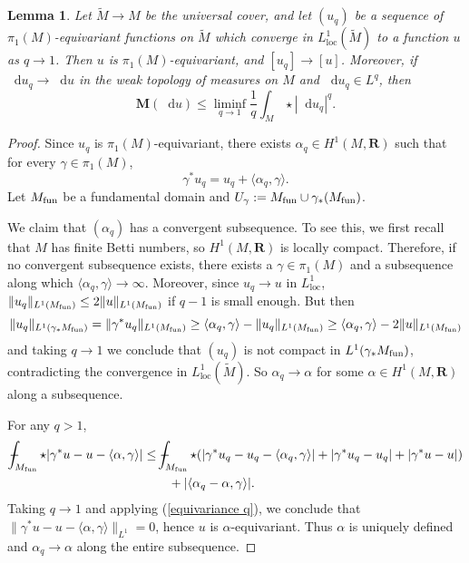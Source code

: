 \documentclass[reqno,11pt]{amsart}
\newcommand{\RR}{\mathbf{R}}
\newcommand*\dif{\mathop{}\!\mathrm{d}}
\newcommand{\Mass}{\mathbf M}
\newcommand{\loc}{\mathrm{loc}}
\newtheorem{lemma}[theorem]{Lemma}
\theoremstyle{definition}
\numberwithin{equation}{section}
\def\Xint#1{\mathchoice
{\XXint\displaystyle\textstyle{#1}}%
{\XXint\textstyle\scriptstyle{#1}}%
{\XXint\scriptstyle\scriptscriptstyle{#1}}%
{\XXint\scriptscriptstyle\scriptscriptstyle{#1}}%
\!\int}
\def\XXint#1#2#3{{\setbox0=\hbox{$#1{#2#3}{\int}$ }
\vcenter{\hbox{$#2#3$ }}\kern-.6\wd0}}
\def\dashint{\Xint-}
\begin{document}
\begin{lemma}\label{L1 convergence preserves pi1}
Let $\tilde M \to M$ be the universal cover, and let $(u_q)$ be a sequence of $\pi_1(M)$-equivariant functions on $\tilde M$ which converge in $L^1_\loc(\tilde M)$ to a function $u$ as $q \to 1$.
Then $u$ is $\pi_1(M)$-equivariant, and $[u_q] \to [u]$.
Moreover, if $\dif u_q \to \dif u$ in the weak topology of measures on $M$ and $\dif u_q \in L^q$, then
\begin{equation}\label{q to 1 Holder}
\Mass(\dif u) \leq \liminf_{q \to 1} \frac{1}{q} \int_M \star |\dif u_q|^q.
\end{equation}
\end{lemma}
\begin{proof}
Since $u_q$ is $\pi_1(M)$-equivariant, there exists $\alpha_q \in H^1(M, \RR)$ such that for every $\gamma \in \pi_1(M)$,
\begin{equation}\label{equivariance q}
	\gamma^* u_q = u_q + \langle \alpha_q, \gamma\rangle.
\end{equation}
Let $M_{\rm fun}$ be a fundamental domain and $U_\gamma := M_{\rm fun} \cup \gamma_* (M_{\rm fun})$.

We claim that $(\alpha_q)$ has a convergent subsequence.
To see this, we first recall that $M$ has finite Betti numbers, so $H^1(M, \RR)$ is locally compact.
Therefore, if no convergent subsequence exists, there exists a $\gamma \in \pi_1(M)$ and a subsequence along which $\langle \alpha_q, \gamma\rangle \to \infty$.
Moreover, since $u_q \to u$ in $L^1_\loc$, $\|u_q\|_{L^1(M_{\rm fun})} \leq 2\|u\|_{L^1(M_{\rm fun})}$ if $q - 1$ is small enough.
But then 
$$\|u_q\|_{L^1(\gamma_* M_{\rm fun})} = \|\gamma^* u_q\|_{L^1(M_{\rm fun})} \geq \langle \alpha_q, \gamma\rangle - \|u_q\|_{L^1(M_{\rm fun})} \geq \langle \alpha_q, \gamma\rangle - 2\|u\|_{L^1(M_{\rm fun})}$$
and taking $q \to 1$ we conclude that $(u_q)$ is not compact in $L^1(\gamma_* M_{\rm fun})$, contradicting the convergence in $L^1_\loc(\tilde M)$.
So $\alpha_q \to \alpha$ for some $\alpha \in H^1(M, \RR)$ along a subsequence.

For any $q > 1$,
\begin{align*}
\dashint_{M_{\rm fun}} \star |\gamma^* u - u - \langle \alpha, \gamma\rangle| 
&\leq \dashint_{M_{\rm fun}} \star (|\gamma^* u_q - u_q - \langle \alpha_q, \gamma\rangle| + |\gamma^* u_q - u_q| + |\gamma^* u - u|) \\
&\qquad + |\langle \alpha_q - \alpha, \gamma\rangle|.
\end{align*}
Taking $q \to 1$ and applying (\ref{equivariance q}), we conclude that $\|\gamma^* u - u - \langle \alpha, \gamma\rangle\|_{L^1} = 0$, hence $u$ is $\alpha$-equivariant.
Thus $\alpha$ is uniquely defined and $\alpha_q \to \alpha$ along the entire subsequence.


\end{proof}
\end{document}
